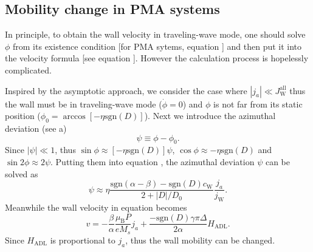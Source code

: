 \documentclass[12pt]{iopart}
\begin{document}
\subsection{Mobility change in PMA systems}\label{MobilityChangeByADLSOT:PMA}
In principle, to obtain the wall velocity in traveling-wave mode, one should solve $\phi$
from its existence condition [for PMA sytems, equation ]
and then put it into the velocity formula [see equation ].
However the calculation process is hopelessly complicated.

Inspired by the asymptotic approach\cite{AGoussev_PRB,AGoussev_Royal, jlu_prb_2016,jlu_SciRep_2017,jlu_Nanomaterials_2017},
we consider the case where $|j_a|\ll J_{\mathrm{W}}^{\mathrm{all}}$ thus
the wall must be in traveling-wave mode ($\dot{\phi}=0$) and
$\phi$ is not far from its static position ($\phi_0=\arccos[-\eta\mathrm{sgn}(D)]$).
Next we introduce the azimuthal deviation (see a)
\begin{equation}\label{psi_definition_all3_PMA}
\psi\equiv\phi-\phi_0.
\end{equation}
Since $|\psi|\ll 1$, thus $\sin\phi\approx[-\eta\mathrm{sgn}(D)]\psi$,
$\cos\phi\approx -\eta\mathrm{sgn}(D)$ and $\sin 2\phi\approx 2\psi$.
Putting them into equation , the azimuthal deviation $\psi$ can be
solved as
\begin{equation}\label{psi_solved_all3_PMA}
\psi\approx \eta\frac{\mathrm{sgn}(\alpha-\beta)-\mathrm{sgn}(D)c_{\mathrm{W}}}{2+|D|/D_0}\frac{j_a}{j_{\mathrm{W}}}.
\end{equation}
Meanwhile the wall velocity in equation  becomes
\begin{equation}\label{v_all3_PMA_small_ja}
v=-\frac{\beta}{\alpha}\frac{\mu_{\mathrm{B}} P}{e M_s}j_a+\frac{-\mathrm{sgn}(D)\gamma\pi\Delta}{2\alpha}H_{\mathrm{ADL}}.
\end{equation}
Since $H_{\mathrm{ADL}}$ is proportional to $j_a$, thus the wall mobility can be changed.
\end{document}
